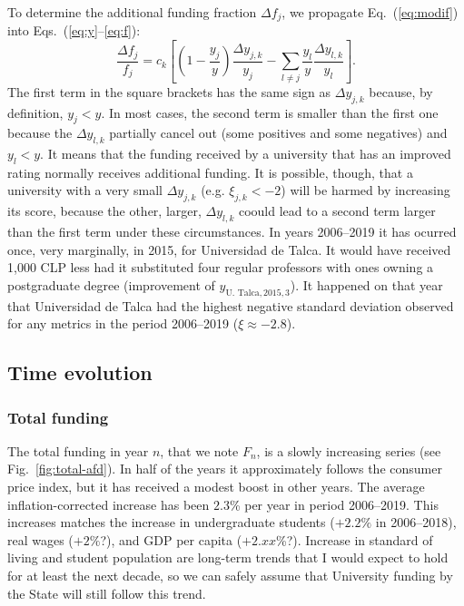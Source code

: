 \documentclass[twocolumn]{article}
\def\eqref#1{Eq.~(\ref{eq:#1})}
\def\eqsref#1#2{Eqs.~(\ref{eq:#1}--\ref{eq:#2})}
\begin{document}
To determine the additional funding fraction $\Delta f_j$, we propagate 
\eqref{modif} into \eqsref{y}{f}:
\begin{equation}
    \frac{\Delta f_j}{f_j} = c_k \left[
                     \left(1 - \frac{y_{j}}y\right)\frac{\Delta y_{j,k}}{y_{j}}
                    - \sum_{l \ne j} \frac{y_l}y \frac{\Delta y_{l,k}}{y_l}
                 \right].
\end{equation}
The first term in the square brackets has the same sign as $\Delta y_{j,k}$ because, by definition, $y_j < y$.  In most cases, the second term is smaller than the first one because the $\Delta y_{l,k}$ partially cancel out (some positives and some negatives) and $y_l < y$. It means that the funding received by a university that has an improved rating normally receives additional funding.  It is possible, though, that a university with a very small $\Delta y_{j,k}$ (e.g. $\xi_{j,k} < -2$) will be harmed by increasing its score, because the other, larger, $\Delta y_{l,k}$ coould lead to a second term larger than the first term under these circumstances.  In years 2006--2019 it has ocurred once, very marginally, in 2015, for Universidad de Talca.  It would have received 1,000 CLP less had it substituted four regular professors with ones owning a postgraduate degree (improvement of $y_{\text{U. Talca}, 2015, 3}$).  It happened on that year that Universidad de Talca had the highest negative standard deviation observed for any metrics in the period 2006--2019 ($\xi \approx -2.8$). 

\subsection{Time evolution}
\subsubsection{Total funding}
The total funding in year $n$, that we note $F_{n}$, is a slowly increasing series (see Fig.~\ref{fig:total-afd}). In half of the years it approximately follows the consumer price index, but it has received a modest boost in other years.  The average inflation-corrected increase has been $2.3$\% per year in period 2006--2019. This increases matches the increase in undergraduate students ($+2.2\%$ in 2006--2018), real wages ($+2\%$?), and GDP per capita ($+2.xx$\%?). Increase in standard of living and student population are long-term trends that I would expect to hold for at least the next decade, so we can safely assume that University funding by the State will still follow this trend.
\end{document}
